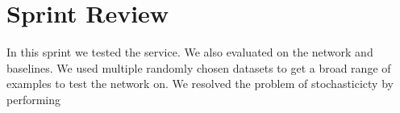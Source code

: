 \section{Sprint Review} \label{sprint_4_review}
In this sprint we tested the service. We also evaluated on the network and baselines.
We used multiple randomly chosen datasets to get a broad range of examples to test the network on. We resolved the problem of stochasticicty by performing 